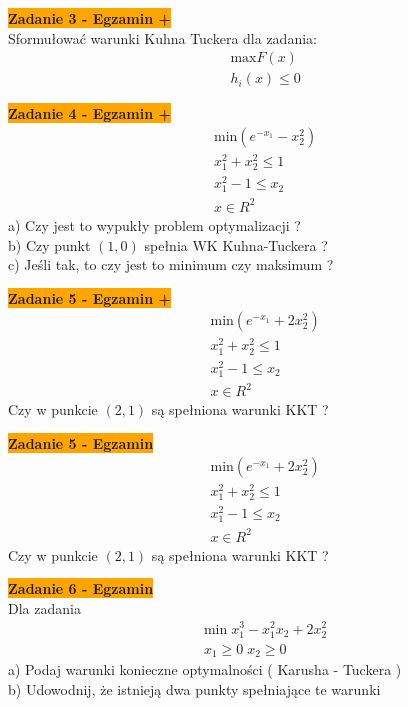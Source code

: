 \documentclass[a4paper,11pt]{article}
\begin{document}
\begin{framed}
\textbf{\colorbox{orange}{Zadanie 3 - Egzamin +}} \\
Sformułować warunki Kuhna Tuckera dla zadania: 
\begin{align*}
& \text{max} F(x) \\
& h_i(x) \leq 0 
\end{align*}
\end{framed}

\begin{framed}
\textbf{\colorbox{orange}{Zadanie 4 - Egzamin + }} \\
\begin{align*}
& \text{min} ( e^{-x_1}-x_2^2 ) \\
& x_1^2+x_2^2 \leq 1 \\
& x_1^2-1 \leq x_2 \\
& x \in R^2 
\end{align*}
a) Czy jest to wypukły problem optymalizacji ? \\
b) Czy punkt \( (1,0) \) spełnia WK Kuhna-Tuckera ? \\
c) Jeśli tak, to czy jest to minimum czy maksimum ?
\end{framed}

\begin{framed}
\textbf{\colorbox{orange}{Zadanie 5 - Egzamin +}} \\
\begin{align*}
& \text{min} ( e^{-x_1}+2x_2^2 ) \\
& x_1^2+x_2^2 \leq 1 \\
& x_1^2-1 \leq x_2 \\
& x \in R^2 
\end{align*}
Czy w punkcie \( (2,1) \) są spełniona warunki KKT ?
\end{framed}

\begin{framed}
\textbf{\colorbox{orange}{Zadanie 5 - Egzamin }} \\
\begin{align*}
& \text{min} ( e^{-x_1}+2x_2^2 ) \\
& x_1^2+x_2^2 \leq 1 \\
& x_1^2-1 \leq x_2 \\
& x \in R^2 
\end{align*}
Czy w punkcie \( (2,1) \) są spełniona warunki KKT ?
\end{framed}

\begin{framed}
\textbf{\colorbox{orange}{Zadanie 6 - Egzamin}} \\
Dla zadania
\begin{align*}
&\text{min} \; x_1^3-x_1^2x_2+2x_2^2 \\
&x_1 \geq 0 \; x_2 \geq 0
\end{align*}
a) Podaj warunki konieczne optymalności ( Karusha - Tuckera ) \\
b) Udowodnij, że istnieją dwa punkty spełniające te warunki
\end{framed}
\end{document}
